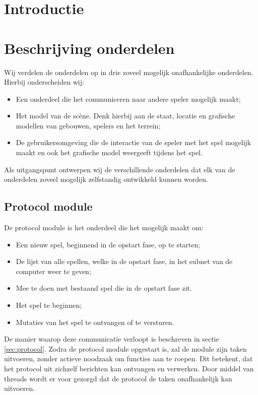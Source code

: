 \documentclass[a4paper,11pt]{article}
\newcommand{\protoref}{sectie \ref{sec:protocol}}
\begin{document}
	
	
	\tableofcontents
	\newpage

	\section{Introductie}
	
	\newpage
    
    
    \section{Beschrijving onderdelen}
    Wij verdelen de onderdelen op in drie zoveel mogelijk onafhankelijke onderdelen. Hierbij onderscheiden wij:
    \begin{itemize}
    	\item Een onderdeel die het communiceren naar andere speler mogelijk maakt;
	\item Het model van de sc\`ene. Denk hierbij aan de staat, locatie en grafische modellen van gebouwen, spelers en het terrein;
	\item De gebruikersomgeving die de interactie van de speler met het spel mogelijk maakt en ook het grafische model weergeeft tijdens het spel.
    \end{itemize}
    
    Als uitgangspunt ontwerpen wij de verschillende onderdelen dat elk van de onderdelen zoveel mogelijk zelfstandig ontwikkeld kunnen worden.
    	
    \subsection{Protocol module}
    	De protocol module is het onderdeel die het mogelijk maakt om:
	\begin{itemize}
		\item Een nieuw spel, beginnend in de opstart fase, op te starten;
		\item De lijst van alle spellen, welke in de opstart fase, in het subnet van de computer weer te geven;
		\item Mee te doen met bestaand spel die in de opstart fase zit.
		\item Het spel te beginnen;
		\item Mutaties van het spel te ontvangen of te versturen.
	\end{itemize}
	De manier waarop deze communicatie verloopt is beschreven in \protoref. Zodra de protocol module opgestart is, zal de module zijn taken uitvoeren, zonder actieve noodzaak om functies aan te roepen. Dit betekent, dat het protocol uit zichzelf berichten kan ontvangen en verwerken. Door middel van threads wordt er voor gezorgd dat de protocol de taken onafhankelijk kan uitvoeren.
	    
\end{document}
